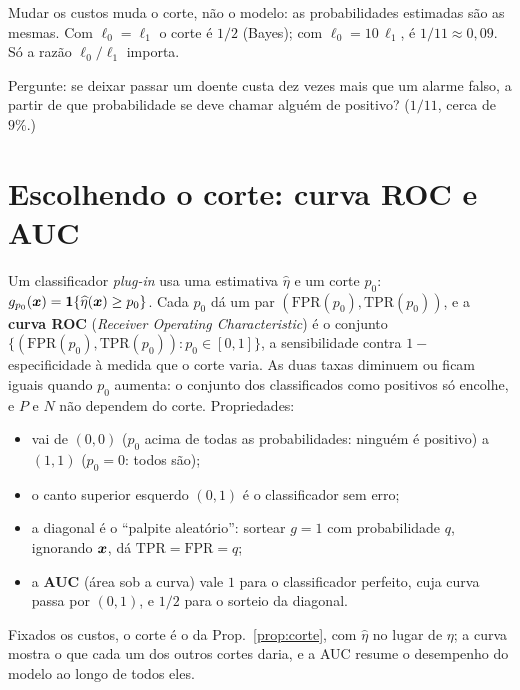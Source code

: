 \documentclass[11pt,a4paper]{article}
\begin{document}
\begin{ideia}
Mudar os custos muda o corte, não o modelo: as probabilidades estimadas são as
mesmas. Com $\ell_0=\ell_1$ o corte é $1/2$ (Bayes); com $\ell_0=10\,\ell_1$, é
$1/11\approx0{,}09$. Só a razão $\ell_0/\ell_1$ importa.
\end{ideia}

\begin{emsala}
Pergunte: se deixar passar um doente custa dez vezes mais que um alarme falso, a
partir de que probabilidade se deve chamar alguém de positivo? ($1/11$, cerca de
$9\%$.)
\end{emsala}

\section{Escolhendo o corte: curva ROC e AUC}\label{sec:roc}
Um classificador \emph{plug-in} usa uma estimativa $\widehat\eta$ e um corte $p_0$:
$g_{p_0}(\bm{x})=\mathbf{1}\!\left\{\widehat\eta(\bm{x})\ge p_0\right\}$. Cada $p_0$ dá um par
$(\text{FPR}(p_0),\text{TPR}(p_0))$, e a \textbf{curva ROC} (\emph{Receiver Operating
Characteristic}) é o conjunto $\{(\text{FPR}(p_0),\text{TPR}(p_0)) : p_0\in[0,1]\}$,
a sensibilidade contra $1-$especificidade à medida que o corte varia. As duas taxas
diminuem ou ficam iguais quando $p_0$ aumenta: o conjunto dos classificados como
positivos só encolhe, e $P$ e $N$ não dependem do corte. Propriedades:
\begin{itemize}[leftmargin=1.4cm,nosep]
  \item vai de $(0,0)$ ($p_0$ acima de todas as probabilidades: ninguém é positivo) a
        $(1,1)$ ($p_0=0$: todos são);
  \item o canto superior esquerdo $(0,1)$ é o classificador sem erro;
  \item a diagonal é o ``palpite aleatório'': sortear $g=1$ com probabilidade $q$,
        ignorando $\bm{x}$, dá $\text{TPR}=\text{FPR}=q$;
  \item a \textbf{AUC} (área sob a curva) vale $1$ para o classificador perfeito, cuja
        curva passa por $(0,1)$, e $1/2$ para o sorteio da diagonal.
\end{itemize}

\begin{ideia}
Fixados os custos, o corte é o da Prop.~\ref{prop:corte}, com $\widehat\eta$ no lugar
de $\eta$; a curva mostra o que cada um dos outros cortes daria, e a AUC resume o
desempenho do modelo ao longo de todos eles.
\end{ideia}
\end{document}
